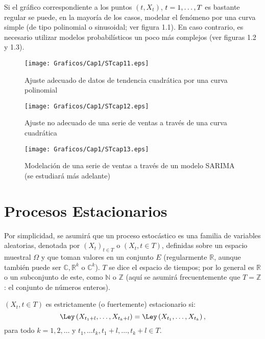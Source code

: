 Si el gr\'{a}fico correspondiente a los puntos $( t,X_{t} )$, $t=1,\mathellipsis ,T$ es bastante regular se puede, en la mayor\'{i}a de los casos, modelar el fen\'{o}meno por una curva simple (de tipo polinomial o sinusoidal; ver figura 1.1). En caso contrario, es necesario utilizar modelos probabil\'{i}sticos un poco m\'{a}s complejos (ver figuras 1.2 y 1.3).

\begin{figure}[H]
\centering
\texttt{[image: Graficos/Cap1/STcap11.eps]}
\caption{Ajuste adecuado de datos de tendencia cuadr\'{a}tica por una 
curva polinomial}
\end{figure}

\begin{figure}[H]
\centering
\texttt{[image: Graficos/Cap1/STcap12.eps]}
\caption{Ajuste no adecuado de una serie de ventas a trav\'{e}s de una 
curva cuadr\'{a}tica}
\end{figure}

\begin{figure}[H]
\centering
\texttt{[image: Graficos/Cap1/STcap13.eps]}
\caption{Modelaci\'{o}n de una serie de ventas a través de un modelo SARIMA (se estudiar\'{a} m\'{a}s adelante)}
\end{figure}

\section{Procesos Estacionarios}

Por simplicidad, se asumir\'{a} que un proceso estoc\'{a}stico es una familia de variables aleatorias, denotada por ${(X_{t})}_{t\in T}$ o $(X_{t}, t\in T)$, definidas sobre un espacio muestral $\Omega$ y que toman valores en un conjunto $E$ (regularmente $\mathbb{R}$, aunque tambi\'{e}n puede ser $\mathbb{C},\mathbb{R}^{k}$ o $\mathbb{C}^{k}$). $T$ se dice el espacio de tiempos; por lo general es $\mathbb{R}$ o un subconjunto de este, como $\mathbb{N}$ o $\mathbb{Z}$ (aqu\'{i} se asumir\'{a} frecuentemente que $T=\mathbb{Z}$: el conjunto de n\'{u}meros enteros).

\begin{definicion}
 $(X_{t}, t\in T)$ es estrictamente (o fuertemente) 
estacionario si:
\[
\Ley\left(X_{t_1+l},\dots,X_{t_k+l}\right) = 
\Ley\left(X_{t_1},\dots,X_{t_k}\right),
\]
para todo $k=1,2,\dots$ y $t_{1},\dots t_{k}, t_{1}+l,\dots,t_{k}+l\in T$.
\end{definicion}

